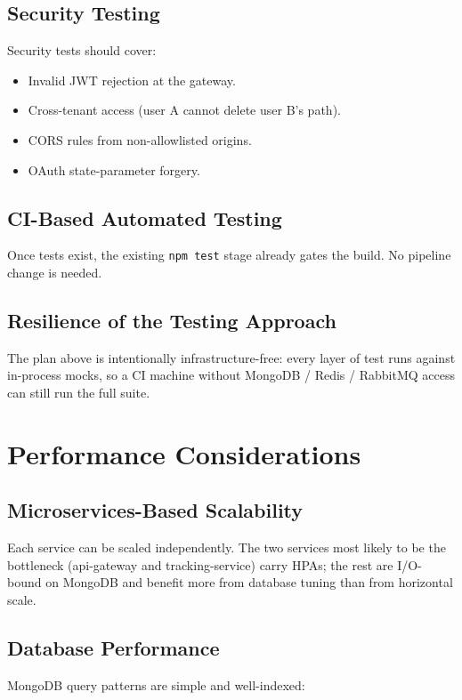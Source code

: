 \documentclass[11pt,a4paper]{article}
\begin{document}
\subsection{Security Testing}
Security tests should cover:

\begin{itemize}[leftmargin=*]
  \item Invalid JWT rejection at the gateway.
  \item Cross-tenant access (user A cannot delete user B's path).
  \item CORS rules from non-allowlisted origins.
  \item OAuth state-parameter forgery.
\end{itemize}

\subsection{CI-Based Automated Testing}
Once tests exist, the existing \texttt{npm test} stage already gates
the build.  No pipeline change is needed.

\subsection{Resilience of the Testing Approach}
The plan above is intentionally infrastructure-free: every layer of
test runs against in-process mocks, so a CI machine without
MongoDB / Redis / RabbitMQ access can still run the full suite.

\section{Performance Considerations}

\subsection{Microservices-Based Scalability}
Each service can be scaled independently.  The two services most
likely to be the bottleneck (api-gateway and tracking-service) carry
HPAs; the rest are I/O-bound on MongoDB and benefit more from
database tuning than from horizontal scale.

\subsection{Database Performance}
MongoDB query patterns are simple and well-indexed:
\end{document}
